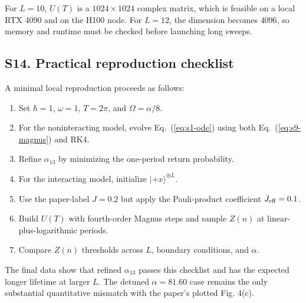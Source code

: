 \documentclass[aps,pra,preprint,superscriptaddress,nofootinbib]{revtex4-2}
\begin{document}
For \(L=10\), \(U(T)\) is a \(1024\times1024\) complex matrix, which is feasible on a local RTX 4090 and on the H100 node. For \(L=12\), the dimension becomes \(4096\), so memory and runtime must be checked before launching long sweeps.

\subsection*{S14. Practical reproduction checklist}

A minimal local reproduction proceeds as follows:
\begin{enumerate}
\item Set \(\hbar=1\), \(\omega=1\), \(T=2\pi\), and \(\Omega=\alpha/8\).
\item For the noninteracting model, evolve Eq.~(\ref{eq:s1-ode}) using both Eq.~(\ref{eq:s9-magnus}) and RK4.
\item Refine \(\alpha_{13}\) by minimizing the one-period return probability.
\item For the interacting model, initialize \(|+x\rangle^{\otimes L}\).
\item Use the paper-label \(J=0.2\) but apply the Pauli-product coefficient \(J_{\rm eff}=0.1\).
\item Build \(U(T)\) with fourth-order Magnus steps and sample \(Z(n)\) at linear-plus-logarithmic periods.
\item Compare \(Z(n)\) thresholds across \(L\), boundary conditions, and \(\alpha\).
\end{enumerate}
The final data show that refined \(\alpha_{13}\) passes this checklist and has the expected longer lifetime at larger \(L\). The detuned \(\alpha=81.60\) case remains the only substantial quantitative mismatch with the paper's plotted Fig. 4(c).
\end{document}

